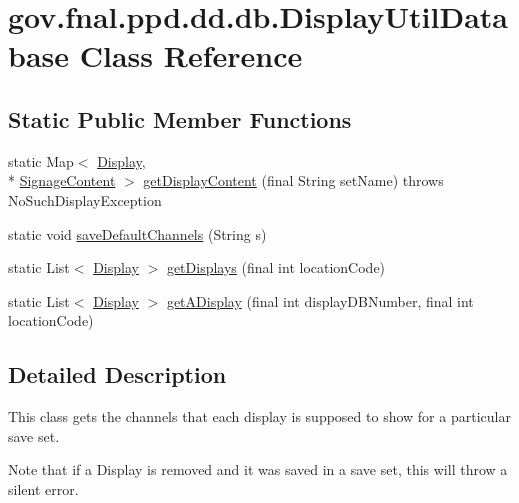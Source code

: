 \hypertarget{classgov_1_1fnal_1_1ppd_1_1dd_1_1db_1_1DisplayUtilDatabase}{\section{gov.\-fnal.\-ppd.\-dd.\-db.\-Display\-Util\-Database Class Reference}
\label{classgov_1_1fnal_1_1ppd_1_1dd_1_1db_1_1DisplayUtilDatabase}
}
\subsection*{Static Public Member Functions}
\begin{DoxyCompactItemize}
\item 
static Map$<$ \hyperlink{interfacegov_1_1fnal_1_1ppd_1_1dd_1_1signage_1_1Display}{Display}, \\*
\hyperlink{interfacegov_1_1fnal_1_1ppd_1_1dd_1_1signage_1_1SignageContent}{Signage\-Content} $>$ \hyperlink{classgov_1_1fnal_1_1ppd_1_1dd_1_1db_1_1DisplayUtilDatabase_a446a9bd0e9237759231cd69e51c309f1}{get\-Display\-Content} (final String set\-Name)  throws No\-Such\-Display\-Exception 
\item 
static void \hyperlink{classgov_1_1fnal_1_1ppd_1_1dd_1_1db_1_1DisplayUtilDatabase_af822fc88bb63cd8996c336f75e550813}{save\-Default\-Channels} (String s)
\item 
static List$<$ \hyperlink{interfacegov_1_1fnal_1_1ppd_1_1dd_1_1signage_1_1Display}{Display} $>$ \hyperlink{classgov_1_1fnal_1_1ppd_1_1dd_1_1db_1_1DisplayUtilDatabase_af34cf8a1aba7561cc426fa40461042db}{get\-Displays} (final int location\-Code)
\item 
static List$<$ \hyperlink{interfacegov_1_1fnal_1_1ppd_1_1dd_1_1signage_1_1Display}{Display} $>$ \hyperlink{classgov_1_1fnal_1_1ppd_1_1dd_1_1db_1_1DisplayUtilDatabase_abbac09241f9349172248740798347d02}{get\-A\-Display} (final int display\-D\-B\-Number, final int location\-Code)
\end{DoxyCompactItemize}


\subsection{Detailed Description}
This class gets the channels that each display is supposed to show for a particular save set.

Note that if a Display is removed and it was saved in a save set, this will throw a silent error.


